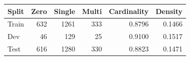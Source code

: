 \begin{tabular}{lrrrrr}
\toprule
Split & Zero & Single & Multi & Cardinality & Density \\
\midrule
Train & 632 & 1261 & 333 & 0.8796 & 0.1466 \\
Dev & 46 & 129 & 25 & 0.9100 & 0.1517 \\
Test & 616 & 1280 & 330 & 0.8823 & 0.1471 \\
\bottomrule
\end{tabular}
